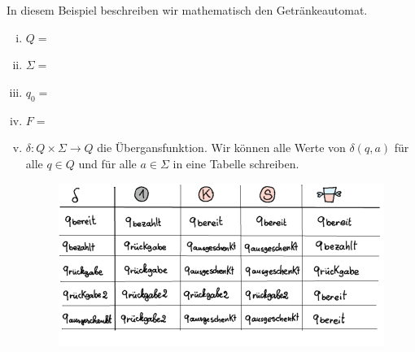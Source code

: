 %
%
In diesem Beispiel beschreiben wir mathematisch den Getränkeautomat.
{
\begin{enumerate}[(i)]
    \item \(Q =\) \blank[width=0.5\linewidth]{}
    \item \(\Sigma =\) \blank[width=0.5\linewidth]{}
    \item \(q_0 =\) \blank[width=0.5\linewidth]{}
    \item \(F =\) \blank[width=0.5\linewidth]{}
    \item \(\delta:Q \times \Sigma \rightarrow Q \) die Übergansfunktion.
    Wir können alle Werte von \(\delta(q,a)\) für alle \(q \in Q\) und für alle \(a \in \Sigma\) in eine Tabelle schreiben.
        \begin{figure}[H]
\centering
\includegraphics[width=\linewidth]{Pictures/Getraenkeautomat_table_sol.png}
\end{figure}
\end{enumerate}
}
